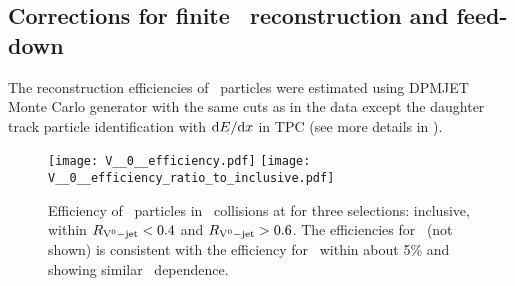 \subsection{Corrections for finite \Vzero\ reconstruction and feed-down}
\label{sec:c05V0EffiMC}

The reconstruction efficiencies of \Vzero\ particles were estimated using DPMJET Monte Carlo generator \cite{Roesler:2000he} with the same cuts as in the data except the daughter track particle identification with ${\rm d}E/{\rm d}x$ in TPC (see more details in \cite{Abelev:2013haa}). 
\begin{figure}[htb]
\begin{center}
\texttt{[image: V\_\_0\_\_efficiency.pdf]}
\texttt{[image: V\_\_0\_\_efficiency\_ratio\_to\_inclusive.pdf]}
\caption{Efficiency of \Vzero\ particles in \pPb\ collisions at  for three selections: inclusive, within $R_{{\rm V}^{0}-{\rm jet}} <0.4$ and $R_{{\rm V}^{0}-{\rm jet}} >0.6$. The efficiencies for \lda\ (not shown) is consistent with the efficiency for \alda\ within about 5\% and showing similar \pt\ dependence.}
\label{fig:c02EffiIncV0s}
\end{center}
\end{figure}
